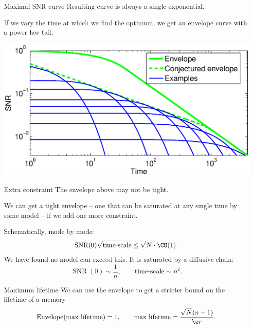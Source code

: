 \documentclass[final,hyperref={pdfpagelabels=false,bookmarks=false}]{beamer}
\DeclareMathOperator{\SNR}{SNR}
\begin{document}
\begin{frame}{}
\begin{columns}[t]
\begin{column}{0.32\linewidth}
\begin{block}{Maximal SNR curve}
 \vp Resulting curve is always a single exponential.

 \vp If we vary the time at which we find the optimum, we get an envelope curve with a power law tail.
 \begin{center}
 \includegraphics[width=15cm]{env.eps}
 \end{center}
%
\end{block}


\begin{block}{Extra constraint}
%
 The envelope above may not be tight.

 \vp We can get a tight envelope
 -- one that can be saturated at any single time by some model --
 if we add one more constraint.

 \vp Schematically, mode by mode:
 \begin{equation*}
   \SNR(0)\sqrt{\text{time-scale}} \leq \sqrt{N}\cdot \CO(1).
 \end{equation*}
 We have found no model can exceed this. It is saturated by a diffusive chain:
 \begin{equation*}
   \SNR(0) \sim \frac{1}{n},
   \qquad
   \text{time-scale} \sim n^2.
 \end{equation*}
%
\end{block}


\begin{block}{Maximum lifetime}
%
 We can use the envelope to get a stricter bound on the lifetime of a memory
 \begin{equation*}
 \begin{aligned}
   \operatorname{Envelope}(\text{max lifetime}) = 1, \qquad
   \text{max lifetime}  = \frac{\sqrt{N}(n-1)}{\e r}.
 \end{aligned}
 \end{equation*}
%
\end{block}


\end{column}
\end{columns}
\end{frame}
\end{document}
